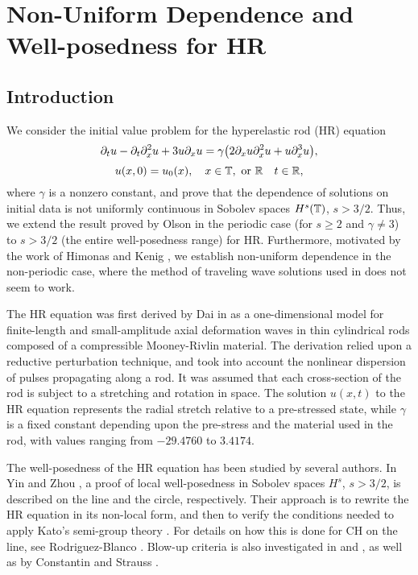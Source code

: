 \chapter{Non-Uniform Dependence and Well-posedness for 
HR}
\section{Introduction}
%
We consider the  initial value problem for
the hyperelastic rod (HR)  equation
%
%
\begin{equation}
\label{hr}
\partial_t u
-
\partial_t \partial_x^2 u
+
3u\partial_x u
=
\gamma \big (
2\partial_x u \partial_x^2 u
+
u \partial_x^3 u
\big ),
\end{equation}
%
%
%
%
\begin{equation}
\label{hr-data} u(x, 0) = u_0 (x),
\quad x \in \mathbb{T}, \ \text{or} \ \mathbb{R} \quad t \in \mathbb{R},
\end{equation}
%
%
where  $\gamma$  is a  nonzero constant,
and prove that the dependence of solutions on initial data is not uniformly 
continuous in Sobolev spaces $H^s(\mathbb{T})$, $s>3/2$.
Thus, we extend the result proved by Olson 
\cite{Olson_2006_Non-uniform-dep} in the periodic
case (for $s\ge 2$ and $\gamma \ne 3$)  to  $s>3/2$ (the entire 
well-posedness range) for HR\@. Furthermore,  motivated by the work of
Himonas  and Kenig \cite{Himonas:2009fk},
we establish non-uniform dependence
in the non-periodic case, where the method of traveling wave solutions used in  
\cite{Olson_2006_Non-uniform-dep} does not seem to work.
%
%

The HR equation was first
derived by Dai in \cite{Dai_1998_Model-equations} as a one-dimensional 
model for finite-length and
small-amplitude axial deformation waves in thin cylindrical
rods composed of a compressible Mooney-Rivlin
material. The derivation relied upon a reductive perturbation technique, 
and took into account the nonlinear dispersion of pulses propagating 
along a rod. It was assumed that each cross-section of the rod is 
subject to a stretching and rotation in space. The solution $u(x,t)$ to the 
HR equation represents the radial stretch relative
to a pre-stressed state, while $\gamma$ is a fixed constant depending upon 
the pre-stress and the material used in
the rod, with values ranging from $- 29.4760$ to $3.4174$.

%
The well-posedness of the HR equation has been studied by several authors. 
In Yin \cite{Yin_2003_On-the-Cauchy-p} and Zhou 
\cite{Zhou_2005_Local-well-pose}, a proof of local well-posedness in Sobolev 
spaces $H^s$,  $s > 3/2$, is described  on the line and the circle, respectively. 
Their approach is to rewrite the HR equation   
in its non-local form, and then to verify the conditions needed to apply 
Kato's semi-group theory \cite{Kato_1975_Quasi-linear-eq}. 
For details on how this is done for CH on the line, see Rodriguez-Blanco 
\cite{Rodriguez-Blanco_2001_On-the-Cauchy-p}. Blow-up criteria 
is also investigated in \cite{Yin_2003_On-the-Cauchy-p} and 
\cite{Zhou_2005_Local-well-pose}, as well as by Constantin and Strauss 
\cite{Constantin_2000_Stability-of-a-}. 


